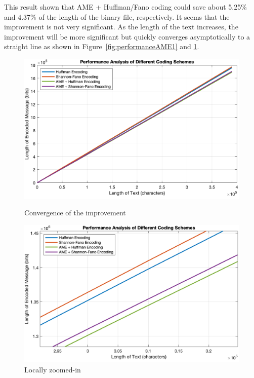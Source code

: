 \documentclass[12pt,twoside]{article}
\begin{document}
This result shown that AME + Huffman/Fano coding could save about 5.25\% and 4.37\% of the length of the binary file, respectively. It seems that the improvement is not very significant. As the length of the text increases, the improvement will be more significant but quickly converges asymptotically to a straight line as shown in Figure~\ref{fig:performanceAME1} and \ref{fig:performanceAME2}.

\begin{figure}[h!]
    \centering
    \begin{minipage}{0.45\textwidth}
        \centering
        \includegraphics[width=\textwidth]{performanceAME1.png}
        \caption{Convergence of the improvement}
        \label{fig:performanceAME1}
    \end{minipage}
    \hfill
    \begin{minipage}{0.45\textwidth}
        \centering
        \includegraphics[width=\textwidth]{performanceAME2.png}
        \caption{Locally zoomed-in}
        \label{fig:performanceAME2}
    \end{minipage}
\end{figure}
\end{document}
